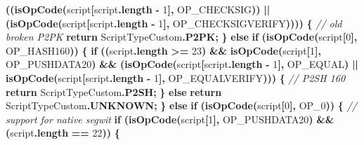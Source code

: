 \documentclass[
  italian,
  openany]{book}
\newenvironment{Shaded}{\begin{snugshade}}{\end{snugshade}}
\newcommand{\CommentTok}[1]{\textcolor[rgb]{0.56,0.35,0.01}{\textit{#1}}}
\newcommand{\ControlFlowTok}[1]{\textcolor[rgb]{0.13,0.29,0.53}{\textbf{#1}}}
\newcommand{\DecValTok}[1]{\textcolor[rgb]{0.00,0.00,0.81}{#1}}
\newcommand{\FunctionTok}[1]{\textcolor[rgb]{0.13,0.29,0.53}{\textbf{#1}}}
\newcommand{\NormalTok}[1]{#1}
\newcommand{\OperatorTok}[1]{\textcolor[rgb]{0.81,0.36,0.00}{\textbf{#1}}}
\begin{document}
\begin{Shaded}
\begin{Highlighting}[]
                   \OperatorTok{((}\FunctionTok{isOpCode}\OperatorTok{(}\NormalTok{script}\OperatorTok{[}\NormalTok{script}\OperatorTok{.}\FunctionTok{length} \OperatorTok{{-}} \DecValTok{1}\OperatorTok{],}\NormalTok{ OP\_CHECKSIG}\OperatorTok{))}
                 \OperatorTok{||} \OperatorTok{(}\FunctionTok{isOpCode}\OperatorTok{(}\NormalTok{script}\OperatorTok{[}\NormalTok{script}\OperatorTok{.}\FunctionTok{length} \OperatorTok{{-}} \DecValTok{1}\OperatorTok{],}\NormalTok{ OP\_CHECKSIGVERIFY}\OperatorTok{))))} \OperatorTok{\{}
            \CommentTok{// old broken P2PK}
            \ControlFlowTok{return}\NormalTok{ ScriptTypeCustom}\OperatorTok{.}\FunctionTok{P2PK}\OperatorTok{;}
        \OperatorTok{\}} \ControlFlowTok{else} \ControlFlowTok{if} \OperatorTok{(}\FunctionTok{isOpCode}\OperatorTok{(}\NormalTok{script}\OperatorTok{[}\DecValTok{0}\OperatorTok{],}\NormalTok{ OP\_HASH160}\OperatorTok{))} \OperatorTok{\{}
            \ControlFlowTok{if} \OperatorTok{((}\NormalTok{script}\OperatorTok{.}\FunctionTok{length} \OperatorTok{\textgreater{}=} \DecValTok{23}\OperatorTok{)} \OperatorTok{\&\&} \FunctionTok{isOpCode}\OperatorTok{(}\NormalTok{script}\OperatorTok{[}\DecValTok{1}\OperatorTok{],}\NormalTok{ OP\_PUSHDATA20}\OperatorTok{)}
                \OperatorTok{\&\&} \OperatorTok{(}\FunctionTok{isOpCode}\OperatorTok{(}\NormalTok{script}\OperatorTok{[}\NormalTok{script}\OperatorTok{.}\FunctionTok{length} \OperatorTok{{-}} \DecValTok{1}\OperatorTok{],}\NormalTok{ OP\_EQUAL}\OperatorTok{)}
                 \OperatorTok{||} \FunctionTok{isOpCode}\OperatorTok{(}\NormalTok{script}\OperatorTok{[}\NormalTok{script}\OperatorTok{.}\FunctionTok{length} \OperatorTok{{-}} \DecValTok{1}\OperatorTok{],}\NormalTok{ OP\_EQUALVERIFY}\OperatorTok{)))} \OperatorTok{\{}
                \CommentTok{// P2SH 160}
                \ControlFlowTok{return}\NormalTok{ ScriptTypeCustom}\OperatorTok{.}\FunctionTok{P2SH}\OperatorTok{;}
            \OperatorTok{\}} \ControlFlowTok{else} \ControlFlowTok{return}\NormalTok{ ScriptTypeCustom}\OperatorTok{.}\FunctionTok{UNKNOWN}\OperatorTok{;}
        \OperatorTok{\}} \ControlFlowTok{else} \ControlFlowTok{if} \OperatorTok{(}\FunctionTok{isOpCode}\OperatorTok{(}\NormalTok{script}\OperatorTok{[}\DecValTok{0}\OperatorTok{],}\NormalTok{ OP\_0}\OperatorTok{))} \OperatorTok{\{}
            \CommentTok{// support for native segwit}
            \ControlFlowTok{if} \OperatorTok{(}\FunctionTok{isOpCode}\OperatorTok{(}\NormalTok{script}\OperatorTok{[}\DecValTok{1}\OperatorTok{],}\NormalTok{ OP\_PUSHDATA20}\OperatorTok{)} \OperatorTok{\&\&} \OperatorTok{(}\NormalTok{script}\OperatorTok{.}\FunctionTok{length} \OperatorTok{==} \DecValTok{22}\OperatorTok{))} \OperatorTok{\{}

\end{Highlighting}
\end{Shaded}
\end{document}
